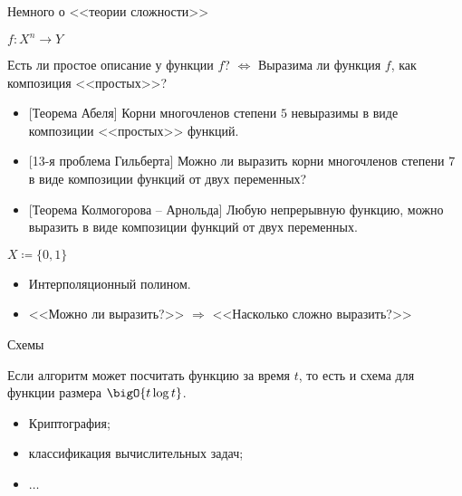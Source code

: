 \begin{frame}{Немного о <<теории сложности>>}

    $f\colon X^n \to Y$

    Есть ли простое описание у функции $f$? \pause $\Leftrightarrow$ Выразима ли функция $f$, как
    композиция <<простых>>?

    \pause

    \begin{itemize}
        \item{} [Теорема Абеля] Корни многочленов степени $5$ невыразимы в виде композиции <<простых>>
            функций.
            \pause
        \item{} [13-я проблема Гильберта] Можно ли выразить корни многочленов степени $7$ в виде
            композиции функций от двух переменных?
            \pause
        \item{} [Теорема Колмогорова -- Арнольда] Любую непрерывную функцию, можно выразить в виде
            композиции функций от двух переменных.      
    \end{itemize}

    \vspace{0.5cm}
    \pause
    $X \coloneqq \{0, 1\}$
    \begin{itemize}
        \item Интерполяционный полином.
        \pause
        \item{} <<Можно ли выразить?>> $\Rightarrow$ <<Насколько сложно выразить?>>
    \end{itemize}
\end{frame}


\begin{frame}{Схемы}

    \begin{center}
        
    \end{center}

    \pause

    \vspace{-0.7cm}
    \begin{theorem}
        Если алгоритм может посчитать функцию за время $t$, то есть и схема для функции размера
        $\bigO{t \log t}$. 
    \end{theorem}

    \pause
    \vspace{0.1cm}
    \begin{itemize}
        \item Криптография;
        \item классификация вычислительных задач;
        \item $\ldots$
    \end{itemize}
\end{frame}

